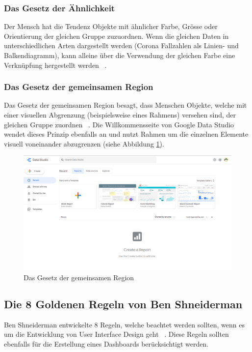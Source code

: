 \subsubsection{Das Gesetz der Ähnlichkeit}
Der Mensch hat die Tendenz Objekte mit ähnlicher Farbe, Grösse oder Orientierung der gleichen Gruppe zuzuordnen. Wenn die gleichen Daten in unterschiedlichen Arten dargestellt werden (Corona Fallzahlen als Linien- und Balkendiagramm), kann alleine über die Verwendung der gleichen Farbe eine Verknüpfung hergestellt werden ~\citep[S. 91-92]{information_dashboard_design}.

\clearpage
\subsubsection{Das Gesetz der gemeinsamen Region}
Das Gesetz der gemeinsamen Region besagt, dass Menschen Objekte, welche mit einer visuellen Abgrenzung (beispielsweise eines Rahmens) versehen sind, der gleichen Gruppe zuordnen ~\citep[S. 92]{information_dashboard_design}. Die Willkommensseite von Google Data Studio wendet dieses Prinzip ebenfalls an und nutzt Rahmen um die einzelnen Elemente visuell voneinander abzugrenzen (siehe Abbildung \ref{fig:principle_of_enclosure}). 

\begin{figure}[h]
    \includegraphics[width=12cm]{images/principle_of_enclosure.png}
    \centering
    \caption{Das Gesetz der gemeinsamen Region ~\citep{principle_of_enclosure_google_data_studio}}
    \label{fig:principle_of_enclosure}
\end{figure}

\subsection{Die 8 Goldenen Regeln von Ben Shneiderman}
Ben Shneiderman entwickelte 8 Regeln, welche beachtet werden sollten, wenn es um die Entwicklung von User Interface Design geht ~\citep{shneiderman_golden_rules}. Diese Regeln sollten ebenfalls für die Erstellung eines Dashboards berücksichtigt werden.

